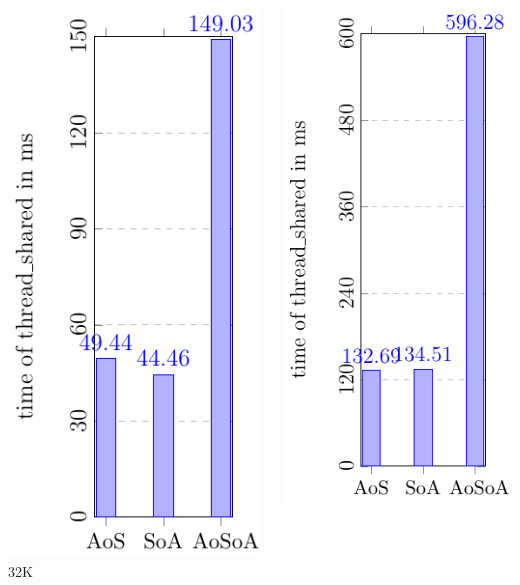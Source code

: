 \documentclass[aspectratio=169]{beamer}
\begin{document}
\begin{frame}
\begin{columns}
\begin{column}{0.25\textwidth}
	\includegraphics[scale=0.55]{figures/fig2.pdf}
	\small 32K
	\end{column}
	\begin{column}{0.25\textwidth}
	\includegraphics[scale=0.55]{figures/fig3.pdf}

\end{column}
\end{columns}
\end{frame}
\end{document}
